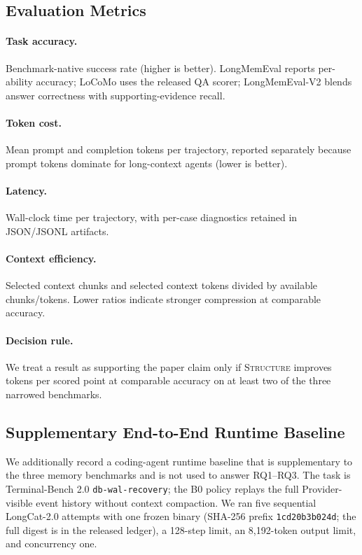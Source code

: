 \subsection{Evaluation Metrics}

\paragraph{Task accuracy.} Benchmark-native success rate (higher is
better). LongMemEval reports per-ability accuracy; LoCoMo uses the
released QA scorer; LongMemEval-V2 blends answer correctness with
supporting-evidence recall.

\paragraph{Token cost.} Mean prompt and completion tokens per
trajectory, reported separately because prompt tokens dominate for
long-context agents (lower is better).

\paragraph{Latency.} Wall-clock time per trajectory, with per-case
diagnostics retained in JSON/JSONL artifacts.

\paragraph{Context efficiency.} Selected context chunks and selected
context tokens divided by available chunks/tokens. Lower ratios
indicate stronger compression at comparable accuracy.

\paragraph{Decision rule.} We treat a result as supporting the paper
claim only if \textsc{Structure} improves tokens per scored point at
comparable accuracy on at least two of the three narrowed benchmarks.

\subsection{Supplementary End-to-End Runtime Baseline}

We additionally record a coding-agent runtime baseline that is
supplementary to the three memory benchmarks and is not used to answer
RQ1--RQ3. The task is Terminal-Bench 2.0
\texttt{db-wal-recovery}; the B0 policy replays the full Provider-visible
event history without context compaction. We ran five sequential
LongCat-2.0 attempts with one frozen binary (SHA-256 prefix
\texttt{1cd20b3b024d}; the full digest is in the released ledger),
a 128-step limit, an 8,192-token output limit, and concurrency one.

